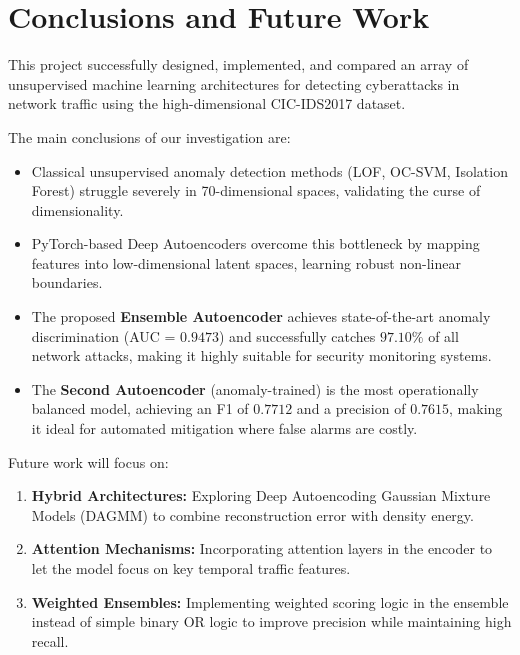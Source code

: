 \section{Conclusions and Future Work}

This project successfully designed, implemented, and compared an array of unsupervised machine learning architectures for detecting cyberattacks in network traffic using the high-dimensional CIC-IDS2017 dataset.

The main conclusions of our investigation are:
\begin{itemize}
  \item Classical unsupervised anomaly detection methods (LOF, OC-SVM, Isolation Forest) struggle severely in 70-dimensional spaces, validating the curse of dimensionality.
  \item PyTorch-based Deep Autoencoders overcome this bottleneck by mapping features into low-dimensional latent spaces, learning robust non-linear boundaries.
  \item The proposed \textbf{Ensemble Autoencoder} achieves state-of-the-art anomaly discrimination (AUC = $0.9473$) and successfully catches \textbf{$97.10\%$} of all network attacks, making it highly suitable for security monitoring systems.
  \item The \textbf{Second Autoencoder} (anomaly-trained) is the most operationally balanced model, achieving an F1 of $0.7712$ and a precision of $0.7615$, making it ideal for automated mitigation where false alarms are costly.
\end{itemize}

Future work will focus on:
\begin{enumerate}
  \item \textbf{Hybrid Architectures:} Exploring Deep Autoencoding Gaussian Mixture Models (DAGMM) to combine reconstruction error with density energy.
  \item \textbf{Attention Mechanisms:} Incorporating attention layers in the encoder to let the model focus on key temporal traffic features.
  \item \textbf{Weighted Ensembles:} Implementing weighted scoring logic in the ensemble instead of simple binary OR logic to improve precision while maintaining high recall.
\end{enumerate}
